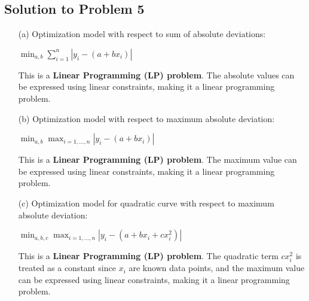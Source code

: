 \documentclass{article}
\begin{document}
\begin{enumerate}
\newpage

\section*{Solution to Problem 5}

\begin{enumerate}
\item[(a)] Optimization model with respect to sum of absolute deviations:

$\min_{a,b} \sum_{i=1}^n |y_i - (a + bx_i)|$

This is a \textbf{Linear Programming (LP) problem}. The absolute values can be expressed using linear constraints, making it a linear programming problem.

\item[(b)] Optimization model with respect to maximum absolute deviation:

$\min_{a,b} \max_{i=1,\ldots,n} |y_i - (a + bx_i)|$

This is a \textbf{Linear Programming (LP) problem}. The maximum value can be expressed using linear constraints, making it a linear programming problem.

\item[(c)] Optimization model for quadratic curve with respect to maximum absolute deviation:

$\min_{a,b,c} \max_{i=1,\ldots,n} |y_i - (a + bx_i + cx_i^2)|$

This is a \textbf{Linear Programming (LP) problem}. The quadratic term $cx_i^2$ is treated as a constant since $x_i$ are known data points, and the maximum value can be expressed using linear constraints, making it a linear programming problem.
\end{enumerate}

\end{enumerate}
\end{document}
